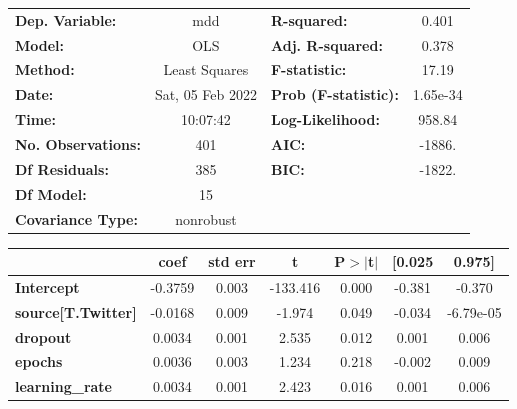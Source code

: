 \begin{center}
\begin{tabular}{lclc}
\toprule
\textbf{Dep. Variable:}              &       mdd        & \textbf{  R-squared:         } &     0.401   \\
\textbf{Model:}                      &       OLS        & \textbf{  Adj. R-squared:    } &     0.378   \\
\textbf{Method:}                     &  Least Squares   & \textbf{  F-statistic:       } &     17.19   \\
\textbf{Date:}                       & Sat, 05 Feb 2022 & \textbf{  Prob (F-statistic):} &  1.65e-34   \\
\textbf{Time:}                       &     10:07:42     & \textbf{  Log-Likelihood:    } &    958.84   \\
\textbf{No. Observations:}           &         401      & \textbf{  AIC:               } &    -1886.   \\
\textbf{Df Residuals:}               &         385      & \textbf{  BIC:               } &    -1822.   \\
\textbf{Df Model:}                   &          15      & \textbf{                     } &             \\
\textbf{Covariance Type:}            &    nonrobust     & \textbf{                     } &             \\
\bottomrule
\end{tabular}
\begin{tabular}{lcccccc}
                                     & \textbf{coef} & \textbf{std err} & \textbf{t} & \textbf{P$> |$t$|$} & \textbf{[0.025} & \textbf{0.975]}  \\
\midrule
\textbf{Intercept}                   &      -0.3759  &        0.003     &  -133.416  &         0.000        &       -0.381    &       -0.370     \\
\textbf{source[T.Twitter]}           &      -0.0168  &        0.009     &    -1.974  &         0.049        &       -0.034    &    -6.79e-05     \\
\textbf{dropout}                     &       0.0034  &        0.001     &     2.535  &         0.012        &        0.001    &        0.006     \\
\textbf{epochs}                      &       0.0036  &        0.003     &     1.234  &         0.218        &       -0.002    &        0.009     \\
\textbf{learning\_rate}              &       0.0034  &        0.001     &     2.423  &         0.016        &        0.001    &        0.006     \\

\end{tabular}
\end{center}
